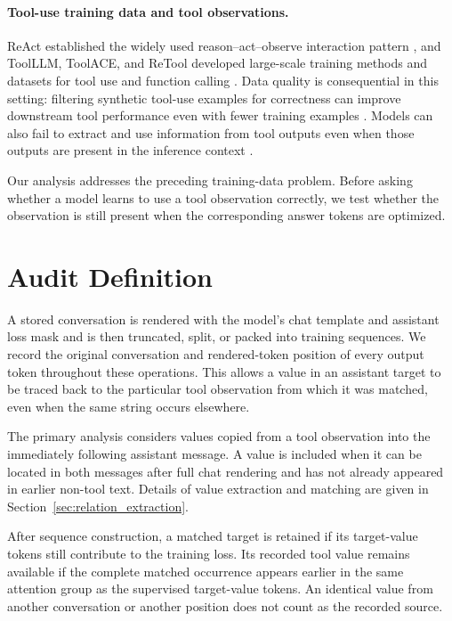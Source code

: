 \documentclass[pdflatex,sn-basic,Numbered]{sn-jnl}
\begin{document}
\paragraph{Tool-use training data and tool observations.}
ReAct established the widely used reason--act--observe interaction pattern
\citep{yao2023react}, and ToolLLM, ToolACE, and ReTool developed large-scale training methods and
datasets for tool use and function calling
\citep{qin2024toolllm,liu2025toolace,feng2025retool}. Data quality is consequential in this
setting: filtering synthetic tool-use examples for correctness can improve downstream tool
performance even with fewer training examples \citep{iskander2024quality}. Models can also fail
to extract and use information from tool outputs even when those outputs are present in the
inference context \citep{kate2026tooloutputs}.

Our analysis addresses the preceding training-data problem. Before asking whether a model learns
to use a tool observation correctly, we test whether the observation is still present when the
corresponding answer tokens are optimized.


\section{Audit Definition}
\label{sec:formulation}

A stored conversation is rendered with the model's chat template and assistant loss mask and is
then truncated, split, or packed into training sequences. We record the original conversation and
rendered-token position of every output token throughout these operations. This allows a value in
an assistant target to be traced back to the particular tool observation from which it was
matched, even when the same string occurs elsewhere.

The primary analysis considers values copied from a tool observation into the immediately following
assistant message. A value is included when it can be located in both messages after full chat
rendering and has not already appeared in earlier non-tool text. Details of value extraction and
matching are given in Section~\ref{sec:relation_extraction}.

After sequence construction, a matched target is retained if its target-value tokens still
contribute to the training loss. Its recorded tool value remains available if the complete matched
occurrence appears earlier in the same attention group as the supervised target-value tokens.
An identical value from another conversation or another position does not count as the recorded
source.
\end{document}
